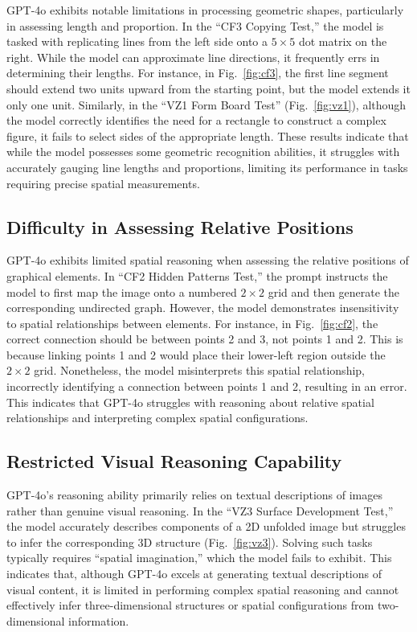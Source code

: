 GPT-4o exhibits notable limitations in processing geometric shapes, particularly in assessing length and proportion.
In the ``CF3 Copying Test,'' the model is tasked with replicating lines from the left side onto a $5 \times 5$ dot matrix on the right.
While the model can approximate line directions, it frequently errs in determining their lengths.
For instance, in Fig.~\ref{fig:cf3}, the first line segment should extend two units upward from the starting point, but the model extends it only one unit.
Similarly, in the ``VZ1 Form Board Test'' (Fig.~\ref{fig:vz1}), although the model correctly identifies the need for a rectangle to construct a complex figure, it fails to select sides of the appropriate length.
These results indicate that while the model possesses some geometric recognition abilities, it struggles with accurately gauging line lengths and proportions, limiting its performance in tasks requiring precise spatial measurements.

\subsection{Difficulty in Assessing Relative Positions}

GPT-4o exhibits limited spatial reasoning when assessing the relative positions of graphical elements.
In ``CF2 Hidden Patterns Test,'' the prompt instructs the model to first map the image onto a numbered $2 \times 2$ grid and then generate the corresponding undirected graph.
However, the model demonstrates insensitivity to spatial relationships between elements.
For instance, in Fig.~\ref{fig:cf2}, the correct connection should be between points 2 and 3, not points 1 and 2.
This is because linking points 1 and 2 would place their lower-left region outside the $2 \times 2$ grid.
Nonetheless, the model misinterprets this spatial relationship, incorrectly identifying a connection between points 1 and 2, resulting in an error.
This indicates that GPT-4o struggles with reasoning about relative spatial relationships and interpreting complex spatial configurations.

\subsection{Restricted Visual Reasoning Capability}

GPT-4o's reasoning ability primarily relies on textual descriptions of images rather than genuine visual reasoning.
In the ``VZ3 Surface Development Test,'' the model accurately describes components of a 2D unfolded image but struggles to infer the corresponding 3D structure (Fig.~\ref{fig:vz3}).
Solving such tasks typically requires ``spatial imagination,'' which the model fails to exhibit.
This indicates that, although GPT-4o excels at generating textual descriptions of visual content, it is limited in performing complex spatial reasoning and cannot effectively infer three-dimensional structures or spatial configurations from two-dimensional information.

